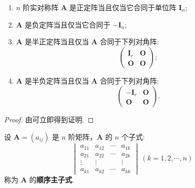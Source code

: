 \documentclass[../../main.tex]{subfiles}
\begin{document}
\begin{theorem}\label{theorem:正定矩阵的充要条件}
\begin{enumerate}[(1)]
\item $n$ 阶实对称阵 $\boldsymbol{A}$ 是正定阵当且仅当它合同于单位阵 $\boldsymbol{I}_n$;

\item $\boldsymbol{A}$ 是负定阵当且仅当它合同于 $-\boldsymbol{I}_n$;

\item $\boldsymbol{A}$ 是半正定阵当且仅当 $\boldsymbol{A}$ 合同于下列对角阵:
\[
\begin{pmatrix}
\boldsymbol{I}_r & \boldsymbol{O}\\
\boldsymbol{O} & \boldsymbol{O}
\end{pmatrix};
\]

\item $\boldsymbol{A}$ 是半负定阵当且仅当 $\boldsymbol{A}$ 合同于下列对角阵:
\[
\begin{pmatrix}
-\boldsymbol{I}_r & \boldsymbol{O}\\
\boldsymbol{O} & \boldsymbol{O}
\end{pmatrix}.
\] 
\end{enumerate}
\end{theorem}
\begin{proof}
由可立即得到证明.
\end{proof}

\begin{definition}[顺序主子式]
设 $\boldsymbol{A}=(a_{ij})$ 是 $n$ 阶矩阵，$\boldsymbol{A}$ 的 $n$ 个子式:
\[
\begin{vmatrix}
a_{11} & a_{12} & \cdots & a_{1k}\\
a_{21} & a_{22} & \cdots & a_{2k}\\
\vdots & \vdots & & \vdots\\
a_{k1} & a_{k2} & \cdots & a_{kk}
\end{vmatrix}\ (k = 1,2,\cdots,n)
\]
称为 $\boldsymbol{A}$ 的\textbf{顺序主子式}.
\end{definition}
\end{document}
